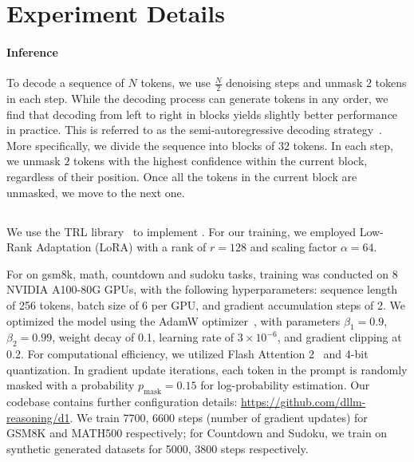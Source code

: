 \newpage
\section{Experiment Details}
\label{appendix:training_details}

\paragraph{Inference} To decode a sequence of $N$ tokens, we use $\frac{N}{2}$ denoising steps and unmask $2$ tokens in each step.
While the decoding process can generate tokens in any order, we find that decoding from left to right in blocks yields slightly better performance in practice. This is referred to as the semi-autoregressive decoding strategy~\citep{nie2025largelanguagediffusionmodels}.
More specifically, we divide the sequence into blocks of 32 tokens. In each step, we unmask $2$ tokens with the highest confidence within the current block, regardless of their position. Once all the tokens in the current block are unmasked, we move to the next one.



\subsection{\grpo}
\label{appendix:grpo-details}

We use the TRL library~\citep{vonwerra2022trl} to implement \grpo. For our \grpo{} training, we employed Low-Rank Adaptation (LoRA) with a rank of $r=128$ and scaling factor $\alpha=64$. 

For \grpo on gsm8k, math, countdown and sudoku tasks, training was conducted on 
8 NVIDIA A100-80G GPUs, with the following hyperparameters: sequence length of 256 tokens, batch size of 6 per GPU, and gradient accumulation steps of 2. 
We optimized the model using the AdamW optimizer~\citep{loshchilov2017decoupled}, with parameters $\beta_1=0.9$, $\beta_2=0.99$, weight decay of 0.1, learning rate of $3 \times 10^{-6}$, and gradient clipping at 0.2. For computational efficiency, we utilized Flash Attention 2~\citep{dao2023flashattention2} and 4-bit quantization. In gradient update iterations, each token in the prompt is randomly masked with a probability $p_{\text{mask}} = 0.15$ for log-probability estimation. Our codebase contains further configuration details: \url{https://github.com/dllm-reasoning/d1}. We train 7700, 6600 steps (number of gradient updates) for GSM8K and MATH500 respectively; for Countdown and Sudoku, we train on synthetic generated datasets for 5000, 3800 steps respectively. 

